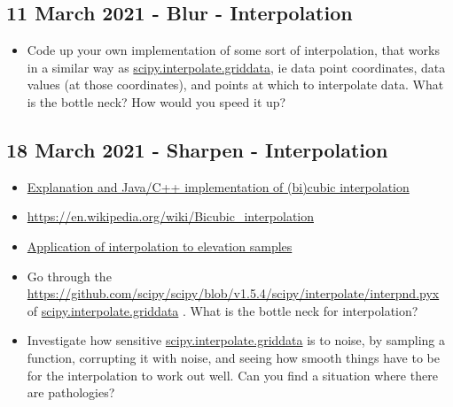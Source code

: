 \documentclass[11pt, oneside]{article}   	%
\begin{document}
\subsection{11 March 2021 - Blur - Interpolation}

\begin{itemize}
	\item Code up your own implementation of some sort of interpolation, that works in a similar way as \href{https://docs.scipy.org/doc/scipy/reference/generated/scipy.interpolate.griddata.html}{scipy.interpolate.griddata}, ie data point coordinates, data values (at those coordinates), and points at which to interpolate data. What is the bottle neck? How would you speed it up? 
\end{itemize}

\subsection{18 March 2021 - Sharpen - Interpolation}
\begin{itemize}
	\item \href{https://www.paulinternet.nl/?page=bicubic}{Explanation and Java/C++ implementation of (bi)cubic interpolation}
	\item \url{https://en.wikipedia.org/wiki/Bicubic_interpolation}
	\item \href{https://web.archive.org/web/20051024202307/http://www.geovista.psu.edu/sites/geocomp99/Gc99/082/gc_082.htm}{Application of interpolation to elevation samples}
\end{itemize}

\begin{itemize} 
	\item Go through the \href{source}{https://github.com/scipy/scipy/blob/v1.5.4/scipy/interpolate/interpnd.pyx} of \href{https://docs.scipy.org/doc/scipy/reference/generated/scipy.interpolate.griddata.html}{scipy.interpolate.griddata} . What is the bottle neck for interpolation?
	\item Investigate how sensitive  \href{https://docs.scipy.org/doc/scipy/reference/generated/scipy.interpolate.griddata.html}{scipy.interpolate.griddata} is to noise, by sampling a function, corrupting it with noise, and seeing how smooth things have to be for the interpolation to work out well. Can you find a situation where there are pathologies? 
\end{itemize}
\end{document}
